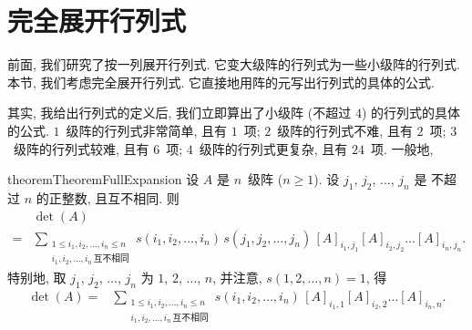 \documentclass[../libro.tex]{subfiles}
\begin{document}
\KunAsteriskoEnEnhavtabelo
\section{完全展开行列式}
\SenAsteriskoEnEnhavtabelo

\maldevigalegajxo

前面, 我们研究了按一列展开行列式.
它变大级阵的行列式为一些小级阵的行列式.
本节, 我们考虑完全展开行列式.
它直接地用阵的元写出行列式的具体的公式.

其实, 我给出行列式的定义后,
我们立即算出了小级阵 (不超过 \(4\))
的行列式的具体的公式.
\(1\)~级阵的行列式非常简单, 且有 \(1\)~项;
\(2\)~级阵的行列式不难, 且有 \(2\)~项;
\(3\)~级阵的行列式较难, 且有 \(6\)~项;
\(4\)~级阵的行列式更复杂, 且有 \(24\)~项.
一般地,

\begin{restatable}{theorem}{TheoremFullExpansion}
    设 \(A\) 是 \(n\)~级阵 (\(n \geq 1\)).
    设 \(j_1\), \(j_2\), \(\dots\), \(j_n\) 是%
    不超过 \(n\) 的正整数,
    且互不相同.
    则
    \begin{align*}
        & \det {(A)}
        \\
        = {} &
        \sum_{\substack{
                1 \leq i_1, i_2, \dots, i_n \leq n \\
                i_1, i_2, \dots, i_n\,\text{互不相同}
        }}
        {s(i_1, i_2, \dots, i_n)\,
            s(j_1, j_2, \dots, j_n)\,
        [A]_{i_1,j_1} [A]_{i_2,j_2} \dots [A]_{i_n,j_n}}.
    \end{align*}
    特别地, 取 \(j_1\), \(j_2\), \(\dots\), \(j_n\)
    为 \(1\), \(2\), \(\dots\), \(n\),
    并注意, \(s(1, 2, \dots, n) = 1\),
    得
    \begin{align*}
        \det {(A)}
        = {} &
        \sum_{\substack{
                1 \leq i_1, i_2, \dots, i_n \leq n \\
                i_1, i_2, \dots, i_n\,\text{互不相同}
        }}
        {s(i_1, i_2, \dots, i_n)\,
        [A]_{i_1,1} [A]_{i_2,2} \dots [A]_{i_n,n}}.
    \end{align*}
\end{restatable}
\end{document}
